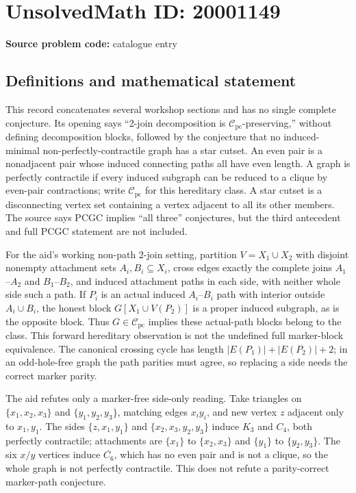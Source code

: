 \documentclass[11pt]{article}
\begin{document}
\section*{UnsolvedMath ID: 20001149}
\textbf{Source problem code:} catalogue entry
\subsection{Definitions and mathematical statement}
This record concatenates several workshop sections and has no single complete conjecture. Its opening says ``2-join decomposition is $\mathcal C_{\mathrm{pc}}$-preserving,'' without defining decomposition blocks, followed by the conjecture that no induced-minimal non-perfectly-contractile graph has a star cutset. An even pair is a nonadjacent pair whose induced connecting paths all have even length. A graph is perfectly contractile if every induced subgraph can be reduced to a clique by even-pair contractions; write $\mathcal C_{\mathrm{pc}}$ for this hereditary class. A star cutset is a disconnecting vertex set containing a vertex adjacent to all its other members. The source says PCGC implies ``all three'' conjectures, but the third antecedent and full PCGC statement are not included.

For the aid's working non-path $2$-join setting, partition $V=X_1\cup X_2$ with disjoint nonempty attachment sets $A_i,B_i\subseteq X_i$, cross edges exactly the complete joins $A_1$--$A_2$ and $B_1$--$B_2$, and induced attachment paths in each side, with neither whole side such a path. If $P_i$ is an actual induced $A_i$--$B_i$ path with interior outside $A_i\cup B_i$, the honest block $G[X_1\cup V(P_2)]$ is a proper induced subgraph, as is the opposite block. Thus $G\in\mathcal C_{\mathrm{pc}}$ implies these actual-path blocks belong to the class. This forward hereditary observation is not the undefined full marker-block equivalence. The canonical crossing cycle has length $|E(P_1)|+|E(P_2)|+2$; in an odd-hole-free graph the path parities must agree, so replacing a side needs the correct marker parity.

The aid refutes only a marker-free side-only reading. Take triangles on $\{x_1,x_2,x_3\}$ and $\{y_1,y_2,y_3\}$, matching edges $x_iy_i$, and new vertex $z$ adjacent only to $x_1,y_1$. The sides $\{z,x_1,y_1\}$ and $\{x_2,x_3,y_2,y_3\}$ induce $K_3$ and $C_4$, both perfectly contractile; attachments are $\{x_1\}$ to $\{x_2,x_3\}$ and $\{y_1\}$ to $\{y_2,y_3\}$. The six $x/y$ vertices induce $\overline{C_6}$, which has no even pair and is not a clique, so the whole graph is not perfectly contractile. This does not refute a parity-correct marker-path conjecture.
\end{document}
